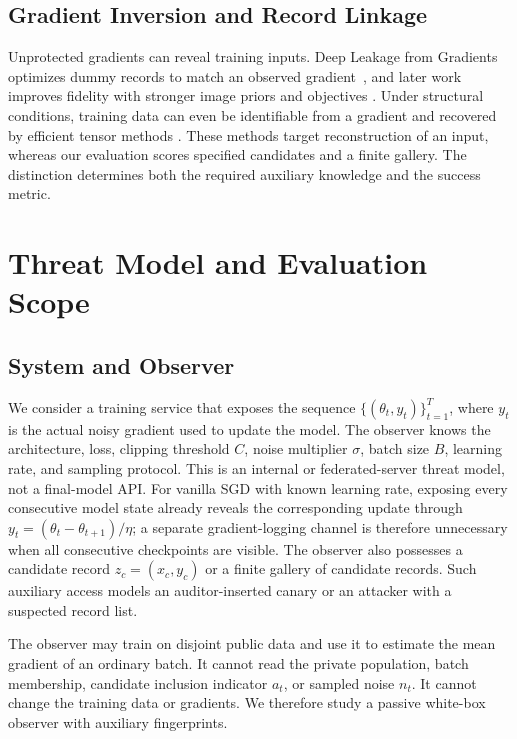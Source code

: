 \documentclass[conference]{IEEEtran}
\begin{document}
\subsection{Gradient Inversion and Record Linkage}

Unprotected gradients can reveal training inputs. Deep Leakage from Gradients optimizes dummy records to match an observed gradient~\cite{zhu2019deep}, and later work improves fidelity with stronger image priors and objectives \cite{geiping2020inverting}. Under structural conditions, training data can even be identifiable from a gradient and recovered by efficient tensor methods \cite{wang2023reconstructing}. These methods target reconstruction of an input, whereas our evaluation scores specified candidates and a finite gallery. The distinction determines both the required auxiliary knowledge and the success metric.

\section{Threat Model and Evaluation Scope}

\subsection{System and Observer}

We consider a training service that exposes the sequence $\{(\theta_t,y_t)\}_{t=1}^{T}$, where $y_t$ is the actual noisy gradient used to update the model. The observer knows the architecture, loss, clipping threshold $C$, noise multiplier $\sigma$, batch size $B$, learning rate, and sampling protocol. This is an internal or federated-server threat model, not a final-model API. For vanilla SGD with known learning rate, exposing every consecutive model state already reveals the corresponding update through $y_t=(\theta_t-\theta_{t+1})/\eta$; a separate gradient-logging channel is therefore unnecessary when all consecutive checkpoints are visible. The observer also possesses a candidate record $z_c=(x_c,y_c)$ or a finite gallery of candidate records. Such auxiliary access models an auditor-inserted canary or an attacker with a suspected record list.

The observer may train on disjoint public data and use it to estimate the mean gradient of an ordinary batch. It cannot read the private population, batch membership, candidate inclusion indicator $a_t$, or sampled noise $n_t$. It cannot change the training data or gradients. We therefore study a passive white-box observer with auxiliary fingerprints.
\end{document}
